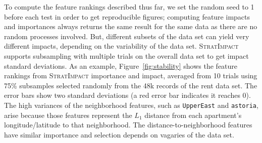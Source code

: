 \documentclass[11pt]{article}
\newcommand{\figref}[1]{Figure~\ref{#1}}
\newcommand{\simp}{\fontfamily{cmr}\textsc{\small StratImpact}}
\begin{document}
To compute the feature rankings described thus far, we set the random seed to 1 before each test in order to get reproducible figures; computing feature impacts and importances always returns the same result for the same data as there are no random processes involved.  But, different subsets of the data set can yield very different impacts, depending on the variability of the data set. \simp{} supports subsampling with multiple trials on the overall data set to get impact standard deviations.  As an example, \figref{fig:stability} shows the  feature rankings from \simp{} importance and impact, averaged from 10 trials using 75\% subsamples selected randomly from the 48k records of the rent data set. The error bars show two standard deviations (a red error bar indicates it reaches 0). The high variances of the neighborhood features, such as {\tt UpperEast} and {\tt astoria}, arise because those features represent the $L_1$ distance from each apartment's longitude/latitude to that neighborhood. The distance-to-neighborhood features have similar importance and selection depends on vagaries of the data set.
 
\end{document}
